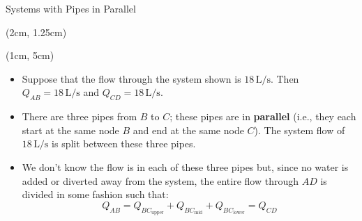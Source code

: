 \documentclass[9pt,xcolor={svgnames, x11names},mathpazo, professionalfonts]{beamer}
\begin{document}
\begin{frame}
	
	\parb
	
\end{frame}

\begin{frame}
	
	\parb
	
\end{frame}

%
\begin{frame}{Systems with Pipes in Parallel}
	
	\begin{textblock*}{0.75\columnwidth}(2cm, 1.25cm)
	\end{textblock*}
	
	\begin{textblock*}{1\columnwidth}(1cm, 5cm)
		\begin{itemize}
			\item Suppose that the flow through the system shown is $18\,\text{L/s}$. Then $Q_{AB}=18\,\text{L/s}$ and $Q_{CD}=18\,\text{L/s}$.\par
			\item There are three pipes from $B$ to $C$; these pipes are in {\bfseries parallel} (i.e., they each start at the same node $B$ and end at the same node $C$). The system flow of $18\,\text{L/s}$ is split between these three pipes. \par
			\item 	We don't know the flow is in each of these three pipes but, since no water is added or diverted away from the system, the entire flow through $AD$ is divided in some fashion such that:
			      \vspace{-0.25cm}
			      \[ Q_{AB} = Q_{BC_\text{upper}} +  Q_{BC_\text{mid}}+ Q_{BC_\text{lower}} = Q_{CD} \]
		\end{itemize}		
		
	\end{textblock*}
\end{frame}
\end{document}
